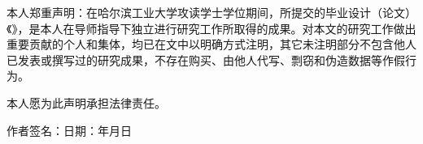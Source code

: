 

本人郑重声明：在哈尔滨工业大学攻读学士学位期间，所提交的毕业设计（论文）《\chinesethesistitle》，是本人在导师指导下独立进行研究工作所取得的成果。对本文的研究工作做出重要贡献的个人和集体，均已在文中以明确方式注明，其它未注明部分不包含他人已发表或撰写过的研究成果，不存在购买、由他人代写、剽窃和伪造数据等作假行为。

本人愿为此声明承担法律责任。

\vspace{\baselineskip}
\hspace{6em}作者签名：\hfill 日期：\hspace{2.5em}年\hspace{1.5em}月\hspace{1.5em}日
